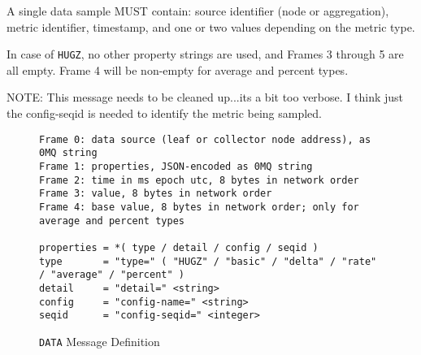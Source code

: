 A single data sample MUST contain: source identifier (node or aggregation), metric identifier, timestamp, and one or two
values depending on the metric type.

In case of \texttt{HUGZ}, no other property strings are used, and Frames 3 through 5 are all empty. Frame 4 will be
non-empty for average and percent types.

NOTE: This message needs to be cleaned up...its a bit too verbose. I think just the config-seqid is needed to identify
      the metric being sampled.

\begin{figure}[H]
\vspace{+10pt}
\begin{verbatim}
Frame 0: data source (leaf or collector node address), as 0MQ string
Frame 1: properties, JSON-encoded as 0MQ string
Frame 2: time in ms epoch utc, 8 bytes in network order
Frame 3: value, 8 bytes in network order
Frame 4: base value, 8 bytes in network order; only for average and percent types

properties = *( type / detail / config / seqid )
type       = "type=" ( "HUGZ" / "basic" / "delta" / "rate" / "average" / "percent" )
detail     = "detail=" <string>
config     = "config-name=" <string>
seqid      = "config-seqid=" <integer>
\end{verbatim}
\vspace{-20pt}
\caption{\texttt{DATA} Message Definition}
\label{fig:message_metric}
\end{figure}
